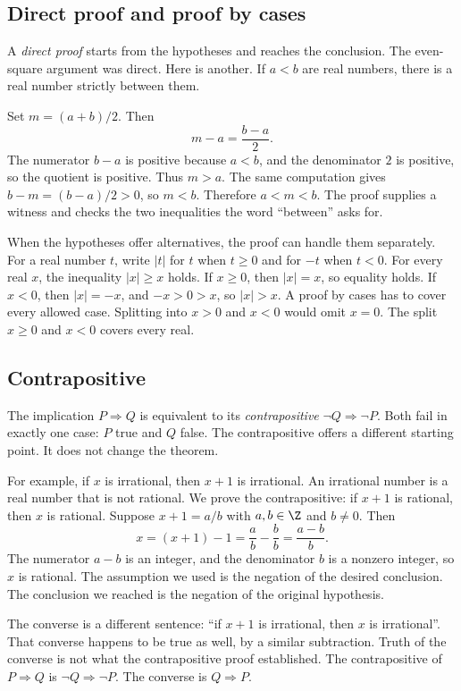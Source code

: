 \subsection*{Direct proof and proof by cases}

A \emph{direct proof} starts from the hypotheses and reaches the conclusion. The even-square argument was direct. Here is another. If $a<b$ are real numbers, there is a real number strictly between them.

Set $m=(a+b)/2$. Then
\[
m-a=\frac{b-a}{2}.
\]
The numerator $b-a$ is positive because $a<b$, and the denominator $2$ is positive, so the quotient is positive. Thus $m>a$. The same computation gives $b-m=(b-a)/2>0$, so $m<b$. Therefore $a<m<b$. The proof supplies a witness and checks the two inequalities the word ``between'' asks for.

When the hypotheses offer alternatives, the proof can handle them separately. For a real number $t$, write $|t|$ for $t$ when $t\ge 0$ and for $-t$ when $t<0$. For every real $x$, the inequality $|x|\ge x$ holds. If $x\ge 0$, then $|x|=x$, so equality holds. If $x<0$, then $|x|=-x$, and $-x>0>x$, so $|x|>x$. A proof by cases has to cover every allowed case. Splitting into $x>0$ and $x<0$ would omit $x=0$. The split $x\ge 0$ and $x<0$ covers every real.

\subsection*{Contrapositive}

The implication $P\Rightarrow Q$ is equivalent to its \emph{contrapositive} $\neg Q\Rightarrow\neg P$. Both fail in exactly one case: $P$ true and $Q$ false. The contrapositive offers a different starting point. It does not change the theorem.

For example, if $x$ is irrational, then $x+1$ is irrational. An irrational number is a real number that is not rational. We prove the contrapositive: if $x+1$ is rational, then $x$ is rational. Suppose $x+1=a/b$ with $a,b\in\Z$ and $b\ne 0$. Then
\[
x=(x+1)-1=\frac{a}{b}-\frac{b}{b}=\frac{a-b}{b}.
\]
The numerator $a-b$ is an integer, and the denominator $b$ is a nonzero integer, so $x$ is rational. The assumption we used is the negation of the desired conclusion. The conclusion we reached is the negation of the original hypothesis.

The converse is a different sentence: ``if $x+1$ is irrational, then $x$ is irrational''. That converse happens to be true as well, by a similar subtraction. Truth of the converse is not what the contrapositive proof established. The contrapositive of $P\Rightarrow Q$ is $\neg Q\Rightarrow\neg P$. The converse is $Q\Rightarrow P$.

